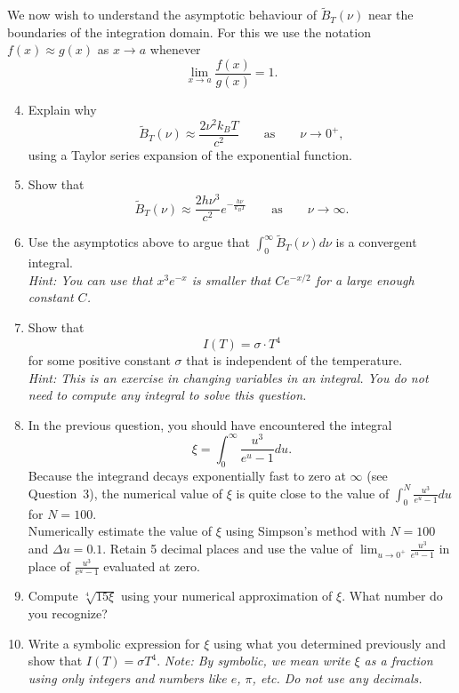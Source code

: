 \documentclass{exam}
\begin{document}
We now wish to understand the asymptotic behaviour of $\tilde{B}_T(\nu)$ near the boundaries of the integration domain.  For this we use the notation $f(x)\approx g(x)$ as $x \to a$ whenever
%
\begin{equation*}
\lim_{x\to a}\frac{f(x)}{g(x)} = 1.
\end{equation*}
%
\begin{enumerate}
\setcounter{enumi}{3}
        \item Explain why $$\tilde{B}_T(\nu) \approx \frac{2\nu^2k_BT}{c^2}\qquad\text{as}\qquad\nu\to 0^+,$$ using a Taylor series expansion of the exponential function.


        \item Show that $$\tilde{B}_T(\nu) \approx \frac{2h\nu^3}{c^2}e^{-\frac{h\nu}{k_B T}}\qquad\text{as}\qquad\nu\to\infty.$$


                
        \item Use the asymptotics above to argue that $\int_0^\infty \tilde B_T(\nu)d \nu$ is a convergent integral. \\ \textit{Hint: You can use that $x^3 e^{-x}$ is smaller that $C e^{-x/2}$ for a large enough constant $C$.}



        \item Show that $$I(T)= \sigma \cdot T^4$$ for some positive constant $\sigma$ that is independent of the temperature. \\ \textit{Hint: This is an exercise in changing variables in an integral. You do not need to compute any integral to solve this question.}

  

        \item In the previous question, you should have encountered the integral $$ \xi = \int_0^\infty \frac{u^3}{e^u-1}du .$$ Because the integrand decays exponentially fast to zero at $\infty$ (see Question~3), the numerical value of $\xi$ is quite close to the value of $\int_0^N \frac{u^3}{e^u-1}du$ for $N=100$. \\ Numerically estimate the value of $\xi$ using Simpson's method with $N=100$ and $\Delta u=0.1$. Retain 5 decimal places and use the value of $\lim_{u \to 0^+} \frac{u^3}{e^u-1}$ in place of $\frac{u^3}{e^u-1}$ evaluated at zero.

  
        \item Compute $\sqrt[4]{15 \xi}$ using your numerical approximation of $\xi$. What number do you recognize?
  
        
        \item Write a symbolic expression for $\xi$ using what you determined previously and show that $I(T)=\sigma T^4$. \textit{Note: By symbolic, we mean write $\xi$ as a fraction using only integers and numbers like $e$, $\pi$, etc. Do not use any decimals.}


    \end{enumerate}
\end{document}
